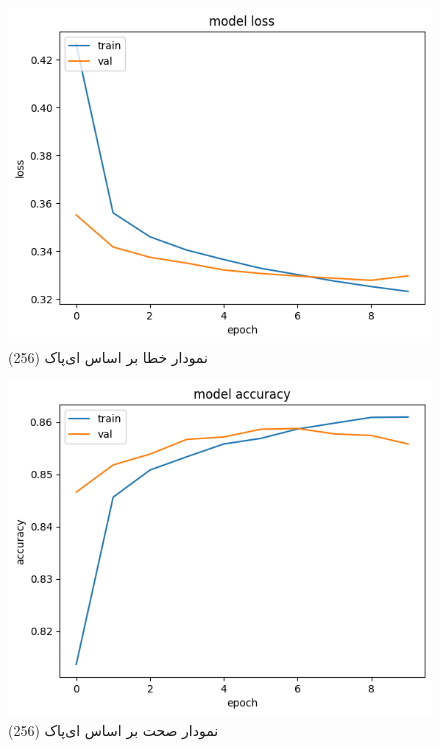 \documentclass{article}
\begin{document}
\begin{figure}[!h]
    \centering\includegraphics[scale=.55]{./p5-1}
    \caption{نمودار خطا بر اساس ای‌پاک (256)}\label{fig.51}
\end{figure}


\begin{figure}[!h]
    \centering\includegraphics[scale=.55]{./p5-2}
    \caption{نمودار صحت بر اساس ای‌پاک (256)}\label{fig.52}
\end{figure}
\end{document}
